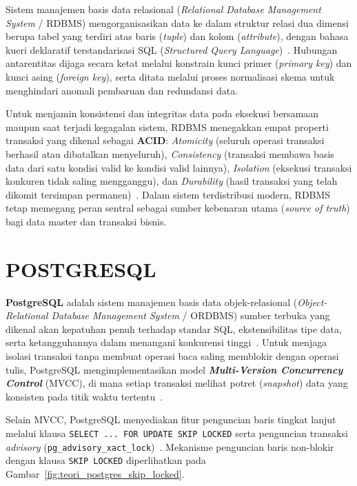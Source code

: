 Sistem manajemen basis data relasional (\textit{Relational Database Management System} / RDBMS) mengorganisasikan data ke dalam struktur relasi dua dimensi berupa tabel yang terdiri atas baris (\textit{tuple}) dan kolom (\textit{attribute}), dengan bahasa kueri deklaratif terstandarisasi SQL (\textit{Structured Query Language})~\cite{silberschatz2020database}. Hubungan antarentitas dijaga secara ketat melalui konstrain kunci primer (\textit{primary key}) dan kunci asing (\textit{foreign key}), serta ditata melalui proses normalisasi skema untuk menghindari anomali pembaruan dan redundansi data.

Untuk menjamin konsistensi dan integritas data pada eksekusi bersamaan maupun saat terjadi kegagalan sistem, RDBMS menegakkan empat properti transaksi yang dikenal sebagai \textbf{ACID}: \textit{Atomicity} (seluruh operasi transaksi berhasil atau dibatalkan menyeluruh), \textit{Consistency} (transaksi membawa basis data dari satu kondisi valid ke kondisi valid lainnya), \textit{Isolation} (eksekusi transaksi konkuren tidak saling mengganggu), dan \textit{Durability} (hasil transaksi yang telah dikomit tersimpan permanen)~\cite{silberschatz2020database}. Dalam sistem terdistribusi modern, RDBMS tetap memegang peran sentral sebagai sumber kebenaran utama (\textit{source of truth}) bagi data master dan transaksi bisnis.

\section{POSTGRESQL}

\textbf{PostgreSQL} adalah sistem manajemen basis data objek-relasional (\textit{Object-Relational Database Management System} / ORDBMS) sumber terbuka yang dikenal akan kepatuhan penuh terhadap standar SQL, ekstensibilitas tipe data, serta ketangguhannya dalam menangani konkurensi tinggi~\cite{postgresql_mvcc}. Untuk menjaga isolasi transaksi tanpa membuat operasi baca saling memblokir dengan operasi tulis, PostgreSQL mengimplementasikan model \textbf{\textit{Multi-Version Concurrency Control}} (MVCC), di mana setiap transaksi melihat potret (\textit{snapshot}) data yang konsisten pada titik waktu tertentu~\cite{postgresql_mvcc}.

Selain MVCC, PostgreSQL menyediakan fitur penguncian baris tingkat lanjut melalui klausa \texttt{SELECT ... FOR UPDATE SKIP LOCKED} serta penguncian transaksi \textit{advisory} (\texttt{pg\_advisory\_xact\_lock})~\cite{postgresql_locking}. Mekanisme penguncian baris non-blokir dengan klausa \texttt{SKIP LOCKED} diperlihatkan pada Gambar~\ref{fig:teori_postgres_skip_locked}.

